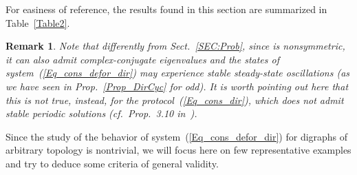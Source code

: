 \documentclass[letterpaper,9pt,twocolumn]{autart}
\newtheorem{remark}{\textbf{Remark}}
\begin{document}
For easiness of reference, the results found in this section are summarized in Table~\ref{Table2}.
\begin{remark}
Note that differently from Sect.~\ref{SEC:Prob}, since
 is nonsymmetric,
it can also admit \emph{complex-conjugate eigenvalues} and the states
of system~(\ref{Eq_cons_defor_dir}) 
may experience stable steady-state oscillations (as we have seen
in Prop.~\ref{Prop_DirCyc} for  odd). It is worth pointing out here
that this is not true, instead, for the protocol~(\ref{Eq_cons_dir}), 
which does not admit stable periodic solutions
(cf.~Prop.~3.10 in~\cite{MesbahiEg_book10}).~\hfill
\end{remark}
Since the study of the behavior of system~(\ref{Eq_cons_defor_dir}) for digraphs
 of arbitrary topology is nontrivial, we will focus here 
on few representative examples and try to deduce some criteria of
general validity.
\end{document}
